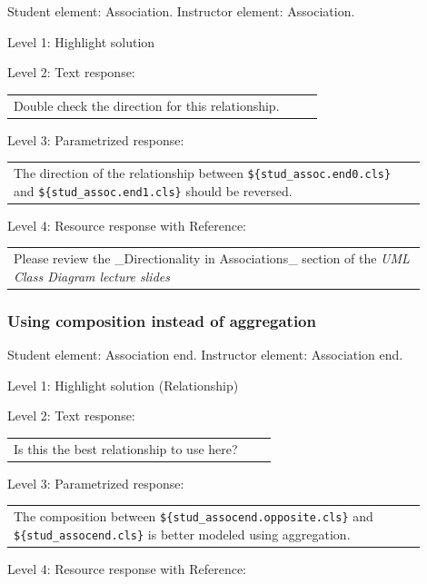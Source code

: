 Student element: Association. Instructor element: Association. \medskip

\noindent Level 1: Highlight solution  \medskip

\noindent Level 2: Text response: \medskip

\begin{tabular}{|p{0.9\linewidth}}
Double check the direction for this relationship.
\end{tabular} \medskip

\noindent Level 3: Parametrized response: \medskip

\begin{tabular}{|p{0.9\linewidth}}
The direction of the relationship between \verb|${stud_assoc.end0.cls}| and \verb|${stud_assoc.end1.cls}| should be reversed.
\end{tabular} \medskip

\noindent Level 4: Resource response with Reference: \medskip

\begin{tabular}{|p{0.9\linewidth}}
Please review the _Directionality in Associations_ section of the \textit{UML Class Diagram lecture slides}
\end{tabular} \medskip


\subsubsection{Using composition instead of aggregation}

Student element: Association end. Instructor element: Association end. \medskip

\noindent Level 1: Highlight solution (Relationship) \medskip

\noindent Level 2: Text response: \medskip

\begin{tabular}{|p{0.9\linewidth}}
Is this the best relationship to use here?
\end{tabular} \medskip

\noindent Level 3: Parametrized response: \medskip

\begin{tabular}{|p{0.9\linewidth}}
The composition between \verb|${stud_assocend.opposite.cls}| and \verb|${stud_assocend.cls}| is better modeled using aggregation.
\end{tabular} \medskip

\noindent Level 4: Resource response with Reference: \medskip

